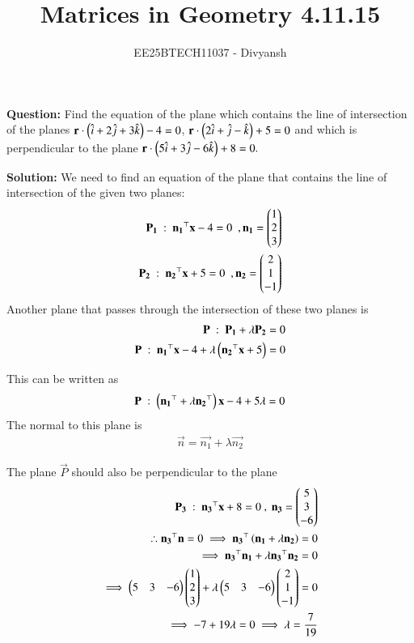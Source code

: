 \documentclass[journal,12pt,onecolumn]{IEEEtran}
\title{Matrices in Geometry 4.11.15}
\author{EE25BTECH11037 - Divyansh}
\theoremstyle{remark}
\begin{document}
\vspace{3cm}
\maketitle
{\let\newpage\relax\maketitle}
\textbf{Question: }
Find the equation of the plane which contains the line of intersection of the planes $\mathbf{r}\cdot\left( \hat{i}+2\hat{j} +3\hat{k}\right)-4=0$, $\mathbf{r}\cdot \left(2\hat{i} + \hat{j} - \hat{k}\right) + 5 = 0$ and which is perpendicular to the plane $\mathbf{r}\cdot\left(5\hat{i} +3\hat{j} - 6\hat{k}\right) +8 = 0.$
\vspace{2mm}

\textbf{Solution:}
 \vspace{1mm}
We need to find an equation of the plane that contains the line of intersection of the given two planes: 
\begin{align}
\mathbf{P_1}\  : \ \mathbf{n_1}^{\top}\mathbf{x}-4=0 \ \ , \mathbf{n_1}=\begin{pmatrix}1 \\ 2 \\ 3 \end{pmatrix} \\
\mathbf{P_2} \ : \ \mathbf{n_2}^{\top}\mathbf{x}+5=0 \ \ , \mathbf{n_2}=\begin{pmatrix}2 \\ 1 \\ -1 \end{pmatrix}
\end{align}
Another plane that passes through the intersection of these two planes is
\begin{align}
    \mathbf{P} \ : \ \mathbf{P_1} + \lambda\mathbf{P_2}=0 \\ 
    \mathbf{P} \ : \ \mathbf{n_1}^{\top}\mathbf{x}-4 + \lambda\left(\mathbf{n_2}^{\top}\mathbf{x}+5\right)=0
\end{align}

This can be written as 
\begin{align}
    \mathbf{P} \ : \ \left(\mathbf{n_1}^{\top}+ \lambda\mathbf{n_2}^{\top}\right)\mathbf{x} -4 + 5\lambda=0
\end{align}
The normal to this plane is 
\begin{align}
    \vec{n}=\vec{n_1} + \lambda\vec{n_2}
\end{align}

The plane $\vec{P}$ should also be perpendicular to the plane 
\begin{align}
    \vec{P_3} \ : \ \vec{n_3}^{\top} \vec{x}+8=0 \ , \ \vec{n_3}=\myvec{5 \\ 3 \\ -6} \\
    \therefore \vec{n_3}^{\top} \vec{n}=0 \implies \vec{n_3}^{\top}\brak{\vec{n_1} + \lambda\vec{n_2}}=0 \\
    \implies \vec{n_3}^{\top}\vec{n_1} + \lambda\vec{n_3}^{\top}\vec{n_2}=0\\
    \implies \myvec{5 & 3 & -6}\myvec{1 \\ 2 \\ 3 }  +  \lambda\myvec{5 & 3 & -6}\myvec{2 \\ 1 \\ -1 }=0 \\
    \implies -7 +19\lambda=0 \implies \lambda = \dfrac{7}{19}
\end{align}
\end{document}
